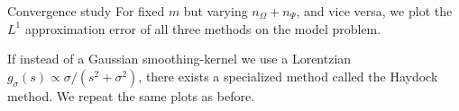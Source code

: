 \documentclass[final, leqno, 12pt]{beamer}
\begin{document}
\begin{frame}[t]
\begin{columns}[t]
\begin{column}{0.45\paperwidth}
        \begin{block}{Convergence study}
            For fixed $m$ but varying $n_{\Omega} + n_{\Psi}$, and vice versa,
            we plot the $L^1$ approximation error of all three methods on the
            model problem.
            \begin{figure}
                \scalebox{1.6}{}
                \scalebox{1.6}{}
            \end{figure}
            \vspace{-30pt}
            If instead of a Gaussian \gls{smoothing-kernel} we use a Lorentzian
            $g_{\sigma}(s) \propto \sigma / (s^2 + \sigma^2)$,
            there exists a specialized method called the Haydock method. We repeat 
            the same plots as before.%
            \begin{figure}
                \scalebox{1.6}{}
                \scalebox{1.6}{}
            \end{figure}
            \vspace{-30pt}
        \end{block}

    \end{column}

\end{columns}


\end{frame}
\end{document}
